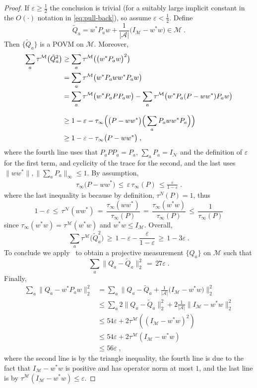 \documentclass[11pt]{article}
\theoremstyle{definition}
\newcommand{\Id}{\ensuremath{I}}
\newcommand{\mA}{\ensuremath{\mathcal{A}}}
\newcommand{\mM}{\ensuremath{\mathcal{M}}}
\newcommand{\eps}{\varepsilon}
\newcommand{\mN}{\mathcal{N}}
\begin{document}
\begin{proof}
If $\eps\geq \frac{1}{2}$ the conclusion is trivial (for a suitably large implicit constant in the $O(\cdot)$ notation in \eqref{eq:pull-back}), so assume $\eps<\frac{1}{2}$. 
Define 
\[\tilde{Q}_a = w^* P_a w  + \frac{1}{|\mA|}\big(\Id_\mM - w^* w\big) \in \mM\;.\]
Then $\{\tilde{Q}_a\}$ is a POVM on $\mM$. Moreover, 
\begin{align*}
\sum_a \tau^\mM \big( \tilde{Q}_a^2 \big) &\geq \sum_a \tau^\mM \big( \big(w^* P_a w \big)^2 \big) \\
&= \sum_a \tau^\mM \big(  w^* P_a w w^*P_a w \big)\\
&= \sum_a \tau^\mM \big(  w^* P_a  P P_a w \big) - \sum_a \tau^\mM \big( w^* P_a  ( P - w w^*) P_a w \big)\\
\intertext{
\hnote{I don't get this next line... how did $\tau_\infty$ show up?}
}
&\geq 1 - \eps -  \tau_\infty\Big(\big( P - w w^*\big)\Big(\sum_a  P_a w w^* P_a\Big)\Big)\\ 
&\geq 1- \eps- \tau_\infty\big( P- w w^*\big)\;,
\end{align*}
where the fourth line uses that $P_aPP_a=P_a$, $\sum_a P_a = \Id_\mN$ and the definition of $\eps$ for the first term, and cyclicity of the trace for the second, and the last uses $\|ww^*\|,\|\sum_a P_a\|_\infty\leq 1$. By assumption, 
\begin{align*}
\tau_\infty\big( P- w w^*\big) \,\leq\, \eps\, \tau_\infty(P)\,\leq \frac{\eps}{1-\eps}\;.
\end{align*}
where the last inequality is because by definition, $\tau^N(P)=1$, thus
\[1-\eps \,\leq\, \tau^\mN(ww^*) \,=\, \frac{\tau_\infty(ww^*)}{\tau_\infty(P)}\,=\, \frac{\tau_\infty(w^*w)}{\tau_\infty(P)}  \,\leq\, \frac{1}{\tau_\infty(P)}\]
since $\tau_\infty(w^* w) = \tau^\mM(w^* w)$ and $w^*w\leq I_\mM$. Overall, 
\[ \sum_a \tau^\mM \big( \tilde{Q}_a^2 \big) \,\geq\, 1-\eps-\frac{\eps}{1-\eps}\,\geq\, 1-3\eps\;.\]
To conclude we apply~\cite[Theorem 1.2]{de2021orthogonalization} to obtain a projective measurement $\{Q_a\}$ on $\mM$ such that 
\begin{equation*}
\sum_a \big\|{Q}_a - \tilde{Q}_a \big\|^2_2 \,=\, 27\eps\;.
\end{equation*}
Finally,
\begin{align*}
\sum_a \big\|{Q}_a - w^*{P}_a w\big\|^2_2 &= \sum_a \Big\|{Q}_a - \tilde{Q}_a  + \frac{1}{|\mA|}\big(I_\mM - w^* w\big) \Big\|^2_2\\
&\leq  \sum_a 2\big\|{Q}_a - \tilde{Q}_a\big\|_2^2  + 2\frac{1}{|\mA|}\big\|I_\mM - w^* w\big\|_2^2 \\
&\leq 54 \eps + 2 \tau^\mM( (I_\mM - w^* w)^2 ) \\
&\leq 54 \eps + 2 \tau^\mM(I_\mM - w^* w ) \\
&\leq 56 \eps\;,
\end{align*}
where the second line is by the triangle inequality, the fourth line is due to the fact that $I_\mM - w^* w$ is positive and has operator norm at most $1$, and the last line is by $\tau^\mM(I_\mM - w^* w ) \leq \eps$.
\end{proof}
\end{document}
